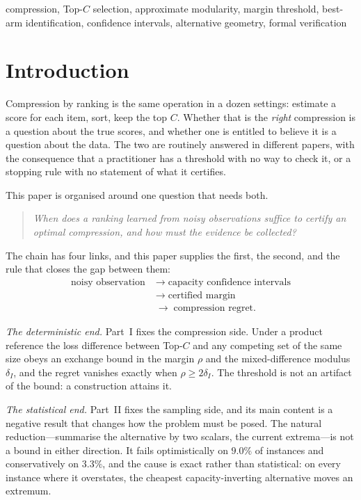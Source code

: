 \begin{IEEEkeywords}
compression, Top-$C$ selection, approximate modularity, margin threshold,
best-arm identification, confidence intervals, alternative geometry, formal verification
\end{IEEEkeywords}

\section{Introduction}

Compression by ranking is the same operation in a dozen settings: estimate a score for each
item, sort, keep the top $C$. Whether that is the \emph{right} compression is a question
about the true scores, and whether one is entitled to believe it is a question about the data.
The two are routinely answered in different papers, with the consequence that a practitioner
has a threshold with no way to check it, or a stopping rule with no statement of what it
certifies.

This paper is organised around one question that needs both.

\begin{quote}
\emph{When does a ranking learned from noisy observations suffice to certify an optimal
compression, and how must the evidence be collected?}
\end{quote}

The chain has four links, and this paper supplies the first, the second, and the rule that
closes the gap between them:
\[
\begin{aligned}
\text{noisy observation}
&\;\longrightarrow\;\text{capacity confidence intervals}\\
&\;\longrightarrow\;\text{certified margin}\\
&\;\longrightarrow\;\text{compression regret}.
\end{aligned}
\]

\emph{The deterministic end.} Part~I fixes the compression side. Under a product reference the
loss difference between Top-$C$ and any competing set of the same size obeys an exchange
bound in the margin $\rho$ and the mixed-difference modulus $\delta_{I}$, and the regret
vanishes exactly when $\rho\ge2\delta_{I}$. The threshold is not an artifact of the bound:
a construction attains it.

\emph{The statistical end.} Part~II fixes the sampling side, and its main content is a
negative result that changes how the problem must be posed. The natural reduction---summarise
the alternative by two scalars, the current extrema---is not a bound in either direction. It
fails optimistically on $9.0\%$ of instances and conservatively on $3.3\%$, and the cause is
exact rather than statistical: on every instance where it overstates, the cheapest
capacity-inverting alternative moves an extremum.

